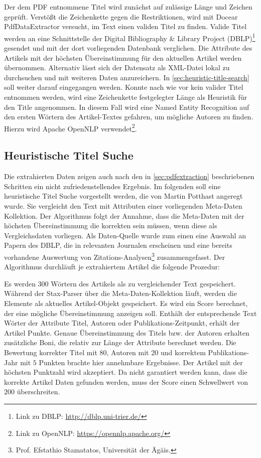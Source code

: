 Der dem PDF entnommene Titel wird zunächst auf zulässige Länge und
Zeichen geprüft. Verstößt die Zeichenkette gegen die Restriktionen,
wird mit Docear PdfDataExtractor versucht, im Text einen validen Titel
zu finden. Valide Titel werden an eine Schnittstelle der Digital
Bibliography \& Library Project (DBLP)\footnote{Link zu DBLP:
\url{http://dblp.uni-trier.de/}} gesendet und mit der dort
vorliegenden Datenbank verglichen. Die Attribute des Artikels mit der
höchsten Übereinstimmung für den aktuellen Artikel werden
übernommen. Alternativ lässt sich der Datensatz als XML-Datei lokal zu
durchsuchen und mit weiteren Daten anzureichern.  In
\autoref{sec:heuristic-title-search} soll weiter darauf eingegangen
werden.  Konnte nach wie vor kein valider Titel entnommen werden, wird
eine Zeichenkette festgelegter Länge als Heuristik für den Title
angenommen. In diesem Fall wird eine Named Entity Recognition auf den
ersten Wörtern des Artikel-Textes gefahren, um mögliche Autoren zu
finden. Hierzu wird Apache OpenNLP verwendet\footnote{Link zu OpenNLP:
\url{https://opennlp.apache.org/}}.



\subsection{Heuristische Titel Suche}\label{sec:heuristic-title-search}

Die extrahierten Daten zeigen auch nach den in
\autoref{sec:pdfextraction} beschriebenen Schritten ein nicht
zufriedenstellendes Ergebnis. Im folgenden soll eine heuristische
Titel Suche vorgestellt werden, die von Martin Potthast angeregt
wurde. Sie vergleicht den Text mit Attributen einer vorliegenden
Meta-Daten Kollektion. Der Algorithmus folgt der Annahme, dass die
Meta-Daten mit der höchsten Übereinstimmung die korrekten sein müssen,
wenn diese als Vergleichsdaten vorliegen. Als Daten-Quelle wurde zum
einen eine Auswahl an Papern des DBLP, die in relevanten Journalen
erscheinen und eine bereits vorhandene Auswertung von
Zitations-Analysen\footnote{Prof. Efstathio Stamatatos, Universität
der Ägäis.} zusammengefasst. Der Algorithmus durchläuft je extrahiertem
Artikel die folgende Prozedur:

Es werden $300$ Wörtern des Artikels als zu
vergleichender Text gespeichert. Während der Stax-Parser über die
Meta-Daten-Kollektion läuft, werden die Elemente als aktuelles
Artikel-Objekt gespeichert. Es wird ein Score berechnet, der eine
mögliche Übereinstimmung anzeigen soll. Enthält der entsprechende Text
Wörter der Attribute Titel, Autoren oder Publikations-Zeitpunkt,
erhält der Artikel Punkte. Genaue Übereinstimmung des Titels bzw. der
Autoren erhalten zusätzliche Boni, die relativ zur Länge der Attribute
berechnet werden. Die Bewertung korrekter Titel mit $80$, Autoren mit $20$
und korrektem Publikations-Jahr mit $5$ Punkten brachte hier annehmbare
Ergebnisse. Der Artikel mit der höchsten Punktzahl wird akzeptiert. Da
nicht garantiert werden kann, dass die korrekte Artikel Daten gefunden
werden, muss der Score einen Schwellwert von $200$ überschreiten.

